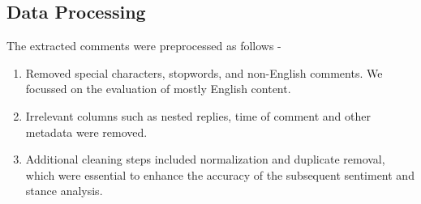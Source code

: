 \documentclass[sigconf, review]{acmart}
\begin{document}
\subsection{Data Processing}
The extracted comments were preprocessed as follows - 

\begin{enumerate}
 \item Removed special characters, stopwords, and non-English comments. We focussed on the evaluation of mostly English content. 
 \item Irrelevant columns such as nested replies, time of comment and other metadata were removed. 
\item Additional cleaning steps included normalization and duplicate removal, which were essential to enhance the accuracy of the subsequent sentiment and stance analysis.

\end{enumerate}


\begin{table}[h]
    \centering
    \renewcommand{\arraystretch}{0.7} %

    \caption{Name of the controversies used and their number of comments. {\color{red}KRIPA: Please put the values.}}
    \label{tab:controversies}
\end{table}
\end{document}
